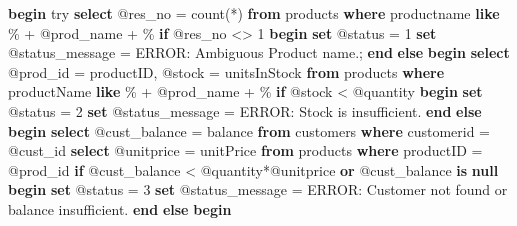\documentclass[
  magyar,
]{article}
\newenvironment{Shaded}{}{}
\newcommand{\ControlFlowTok}[1]{\textcolor[rgb]{0.00,0.44,0.13}{\textbf{#1}}}
\newcommand{\DecValTok}[1]{\textcolor[rgb]{0.25,0.63,0.44}{#1}}
\newcommand{\FunctionTok}[1]{\textcolor[rgb]{0.02,0.16,0.49}{#1}}
\newcommand{\KeywordTok}[1]{\textcolor[rgb]{0.00,0.44,0.13}{\textbf{#1}}}
\newcommand{\NormalTok}[1]{#1}
\newcommand{\OperatorTok}[1]{\textcolor[rgb]{0.40,0.40,0.40}{#1}}
\newcommand{\StringTok}[1]{\textcolor[rgb]{0.25,0.44,0.63}{#1}}
\begin{document}
\begin{Shaded}
\begin{Highlighting}[]
\ControlFlowTok{begin}\NormalTok{ try}
  \KeywordTok{select}\NormalTok{ @res\_no }\OperatorTok{=} \FunctionTok{count}\NormalTok{(}\OperatorTok{*}\NormalTok{) }\KeywordTok{from}\NormalTok{ products }\KeywordTok{where}\NormalTok{ productname }\KeywordTok{like} \StringTok{\textquotesingle{}\%\textquotesingle{}} \OperatorTok{+}\NormalTok{ @prod\_name }\OperatorTok{+} \StringTok{\textquotesingle{}\%\textquotesingle{}}
  \ControlFlowTok{if}\NormalTok{ @res\_no }\OperatorTok{\textless{}\textgreater{}} \DecValTok{1} \ControlFlowTok{begin}
      \KeywordTok{set}\NormalTok{ @status }\OperatorTok{=} \DecValTok{1}
      \KeywordTok{set}\NormalTok{ @status\_message }\OperatorTok{=} \StringTok{\textquotesingle{}ERROR: Ambiguous Product name.\textquotesingle{}}\NormalTok{;}
  \ControlFlowTok{end} \ControlFlowTok{else} \ControlFlowTok{begin}
      \KeywordTok{select}\NormalTok{ @prod\_id }\OperatorTok{=}\NormalTok{ productID, @stock }\OperatorTok{=}\NormalTok{ unitsInStock }\KeywordTok{from}\NormalTok{ products }\KeywordTok{where}
\NormalTok{productName }\KeywordTok{like} \StringTok{\textquotesingle{}\%\textquotesingle{}} \OperatorTok{+}\NormalTok{ @prod\_name }\OperatorTok{+} \StringTok{\textquotesingle{}\%\textquotesingle{}}
      \ControlFlowTok{if}\NormalTok{ @stock }\OperatorTok{\textless{}}\NormalTok{ @quantity }\ControlFlowTok{begin}
          \KeywordTok{set}\NormalTok{ @status }\OperatorTok{=} \DecValTok{2}
          \KeywordTok{set}\NormalTok{ @status\_message }\OperatorTok{=} \StringTok{\textquotesingle{}ERROR: Stock is insufficient.\textquotesingle{}}
      \ControlFlowTok{end} \ControlFlowTok{else} \ControlFlowTok{begin}
          \KeywordTok{select}\NormalTok{ @cust\_balance }\OperatorTok{=}\NormalTok{ balance }\KeywordTok{from}\NormalTok{ customers }\KeywordTok{where}\NormalTok{ customerid }\OperatorTok{=}\NormalTok{ @cust\_id}
          \KeywordTok{select}\NormalTok{ @unitprice }\OperatorTok{=}\NormalTok{ unitPrice }\KeywordTok{from}\NormalTok{ products }\KeywordTok{where}\NormalTok{ productID }\OperatorTok{=}\NormalTok{ @prod\_id}
          \ControlFlowTok{if}\NormalTok{ @cust\_balance }\OperatorTok{\textless{}}\NormalTok{ @quantity}\OperatorTok{*}\NormalTok{@unitprice }\KeywordTok{or}\NormalTok{ @cust\_balance }\KeywordTok{is} \KeywordTok{null}
          \ControlFlowTok{begin}
              \KeywordTok{set}\NormalTok{ @status }\OperatorTok{=} \DecValTok{3}
              \KeywordTok{set}\NormalTok{ @status\_message }\OperatorTok{=} \StringTok{\textquotesingle{}ERROR: Customer not found or balance insufficient.\textquotesingle{}}
          \ControlFlowTok{end} \ControlFlowTok{else} \ControlFlowTok{begin}

\end{Highlighting}
\end{Shaded}
\end{document}
